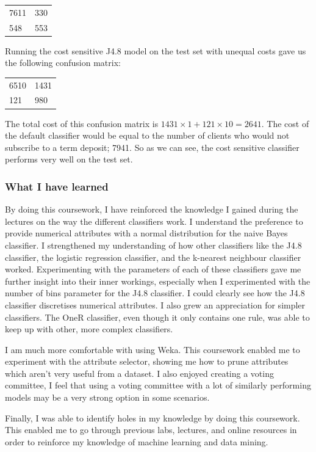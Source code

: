 \documentclass[a4paper,11pt]{article}
\begin{document}
\begin{table}[H]
  \begin{center}
    \begin{tabular}{l l }
      7611 & 330 \\
      548 & 553 \\
    \end{tabular}
  \end{center}
  \label{tab:J48EqualTestCost}
\end{table}

Running the cost sensitive J4.8 model on the test set with unequal costs gave us the following confusion matrix:

\begin{table}[H]
  \begin{center}
    \begin{tabular}{l l }
      6510 & 1431 \\
      121 & 980 \\
    \end{tabular}
  \end{center}
  \label{tab:J48UnequalTestCost}
\end{table}

The total cost of this confusion matrix is $ 1431 \times 1 + 121 \times 10 = 2641 $. The cost of the default classifier
would be equal to the number of clients who would not subscribe to a term deposit; 7941. So as we can see, the cost
sensitive classifier performs very well on the test set. 

\subsubsection{What I have learned}
By doing this coursework, I have reinforced the knowledge I gained during the lectures on the way the different classifiers
work. I understand the preference to provide numerical attributes with a normal distribution for the naive Bayes classifier.
I strengthened my understanding of how other classifiers like the J4.8 classifier, the logistic regression classifier, and the
k-nearest neighbour classifier worked. Experimenting with the parameters of each of these classifiers gave me further insight
into their inner workings, especially when I experimented with the number of bins parameter for the J4.8 classifier. I could clearly
see how the J4.8 classifier discretises numerical attributes. I also grew an appreciation for simpler classifiers. The OneR
classifier, even though it only contains one rule, was able to keep up with other, more complex classifiers.

I am much more comfortable with using Weka. This coursework enabled me to experiment with the attribute selector, showing me
how to prune attributes which aren't very useful from a dataset. I also enjoyed creating a voting committee, I feel that
using a voting committee with a lot of similarly performing models may be a very strong option in some scenarios.

Finally, I was able to identify holes in my knowledge by doing this coursework. This enabled me to go through previous labs,
lectures, and online resources in order to reinforce my knowledge of machine learning and data mining.
\end{document}

